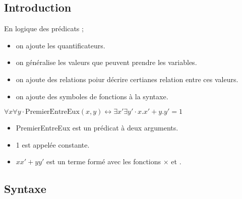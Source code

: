 \subsection{Introduction}

En logique des prédicats ;
\begin{itemize}[label=\textbullet]
    \item on ajoute les quantificateurs.
    \item on généralise les valeurs que peuvent prendre les variables.
    \item on ajoute des relations poiur décrire certianes relation entre ces valeurs.
    \item on ajoute des symboles de fonctions à la syntaxe.
\end{itemize}
\begin{example}
    $\forall x\forall y \cdot \text{PremierEntreEux}(x,y)\leftrightarrow \exists x'\exists y' \cdot x.x'
    + y.y' = 1$
    \begin{itemize}[label=\textbullet]
        \item PremierEntreEux est un prédicat à deux arguments.
        \item 1 est appelée constante.
        \item $x x' + y y'$ est un terme formé avec les fonctions $\times$ et $.$
    \end{itemize}
\end{example}

\subsection{Syntaxe}
\label{subsec:syntaxe}
